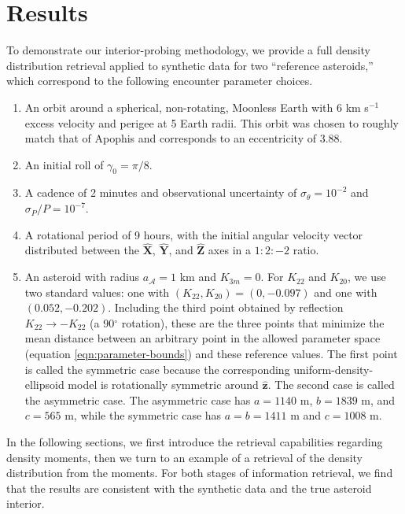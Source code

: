 \documentclass[fleqn,usenatbib]{mnras}
\renewcommand{\unit}[1]{\bm{\hat{#1}}}
\begin{document}
\section{Results}
\label{sec:results}

To demonstrate our interior-probing methodology, we provide a full density distribution retrieval applied to synthetic data for two ``reference asteroids,'' which correspond to the following encounter parameter choices.

\begin{enumerate}
  \item An orbit around a spherical, non-rotating, Moonless Earth with $6$ km s$^{-1}$ excess velocity and perigee at 5 Earth radii. This orbit was chosen to roughly match that of Apophis and corresponds to an eccentricity of 3.88. 
  \item An initial roll of $\gamma_0=\pi/8$.
  \item A cadence of 2 minutes and observational uncertainty of $\sigma_\theta = 10^{-2}$ and $\sigma_P / P = 10^{-7}$.
  \item A rotational period of 9 hours, with the initial angular velocity vector distributed between the $\unit X$, $\unit Y$, and $\unit Z$ axes in a $1:2:-2$ ratio.
  \item An asteroid with radius $a_\mathcal{A} = 1$ km and $K_{3m}=0$. For $K_{22}$ and $K_{20}$, we use two standard values: one with $(K_{22}, K_{20}) = (0, -0.097)$ and one with $(0.052, -0.202)$. Including the third point obtained by reflection $K_{22}\rightarrow -K_{22}$ (a 90$^\circ$ rotation), these are the three points that minimize the mean distance between an arbitrary point in the allowed parameter space (equation \ref{eqn:parameter-bounds}) and these reference values. The first point is called the symmetric case because the corresponding uniform-density-ellipsoid model is rotationally symmetric around $\unit z$. The second case is called the asymmetric case. The asymmetric case has $a=1140$ m, $b=1839$ m, and $c=565$ m, while the symmetric case has $a=b=1411$ m and $c=1008$ m.
\end{enumerate}

In the following sections, we first introduce the retrieval capabilities regarding density moments, then we turn to an example of a retrieval of the density distribution from the moments. For both stages of information retrieval, we find that the results are consistent with the synthetic data and the true asteroid interior.
\end{document}
